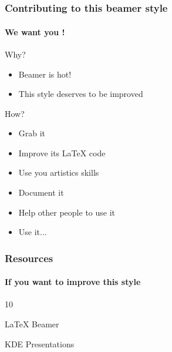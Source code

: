 \documentclass[12pt,aspectratio=169]{beamer}
\begin{document}
\section*{}
\begin{frame}
  \frametitle{Contributing to this beamer style}
  \framesubtitle{We want you !}

  \begin{block}{Why?}
  \begin{itemize}
    \item Beamer is hot!
    \item This style deserves to be improved
  \end{itemize}
  \end{block}

  \begin{block}{How?}
  \begin{itemize}
    \item Grab it
    \item Improve its LaTeX code
    \item Use you artistics skills
    \item Document it
    \item Help other people to use it
    \item Use it...
  \end{itemize}
  \end{block}
\end{frame}

\begin{frame}
  \frametitle{Resources}
  \framesubtitle{If you want to improve this style}
  \begin{thebibliography}{10}

  \beamertemplatearticlebibitems

    LaTeX Beamer

    KDE Presentations

  \end{thebibliography}
\end{frame}

\frame{
  \vspace{2cm}
  {\huge Questions ?}

}
\end{document}
